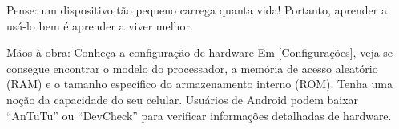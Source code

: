 Pense: um dispositivo tão pequeno carrega quanta vida! Portanto, aprender a usá-lo bem é aprender a viver melhor.

\begin{tcbpractice}{Mãos à obra: Conheça a configuração de hardware}
Em [Configurações], veja se consegue encontrar o modelo do processador, a memória de acesso aleatório (RAM) e o tamanho específico do armazenamento interno (ROM). Tenha uma noção da capacidade do seu celular. Usuários de Android podem baixar “AnTuTu” ou “DevCheck” para verificar informações detalhadas de hardware.

\end{tcbpractice}
